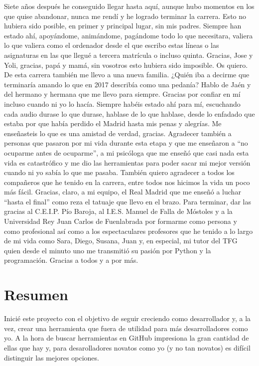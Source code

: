 \documentclass[a4paper, 12pt]{book}
\begin{document}
Siete años después he conseguido llegar hasta aquí, aunque hubo momentos en los que quise abandonar, nunca me rendí y he logrado terminar la carrera. Esto no hubiera sido posible, en primer y principal lugar, sin mis padres. Siempre han estado ahí, apoyándome, animándome, pagándome todo lo que necesitara, valiera lo que valiera como el ordenador desde el que escribo estas líneas o las asignaturas en las que llegué a tercera matrícula o incluso quinta. Gracias, Jose y Yoli, gracias, papá y mamá, sin vosotros esto hubiera sido imposible. Os quiero.
De esta carrera también me llevo a una nueva familia. ¿Quién iba a decirme que terminaría amando lo que en 2017 describía como una pedanía? Hablo de Jaén y del hermano y hermana que me llevo para siempre. Gracias por confiar en mí incluso cuando ni yo lo hacía. Siempre habéis estado ahí para mí, escuchando cada audio durase lo que durase, hablase de lo que hablase, desde lo enfadado que estaba por que había perdido el Madrid hasta mis penas y alegrías. Me enseñasteis lo que es una amistad de verdad, gracias. Agradecer también a personas que pasaron por mi vida durante esta etapa y que me enseñaron a ``no ocuparme antes de ocuparme'', a mi psicóloga que me enseñó que casi nada esta vida es catastrófico y me dio las herramientas para poder sacar mi mejor versión cuando ni yo sabía lo que me pasaba. También quiero agradecer a todos los compañeros que he tenido en la carrera, entre todos nos hicimos la vida un poco más fácil. Gracias, claro, a mi equipo, el Real Madrid que me enseñó a luchar ``hasta el final'' como reza el tatuaje que llevo en el brazo.
Para terminar, dar las gracias al C.E.I.P. Pío Baroja, al I.E.S. Manuel de Falla de Móstoles y a la Universidad Rey Juan Carlos de Fuenlabrada por formarme como persona y como profesional así como a los espectaculares profesores que he tenido a lo largo de mi vida como Sara, Diego, Susana, Juan y, en especial, mi tutor del TFG quien desde el minuto uno me transmitió su pasión por Python y la programación. Gracias a todos y a por más.


\chapter*{Resumen}

Inicié este proyecto con el objetivo de seguir creciendo como desarrollador y, a la vez, crear una herramienta que fuera de utilidad para más desarrolladores como yo. A la hora de buscar herramientas en GitHub impresiona la gran cantidad de ellas que hay y, para desarolladores novatos como yo (y no tan novatos) es difícil distinguir las mejores opciones.
\end{document}
